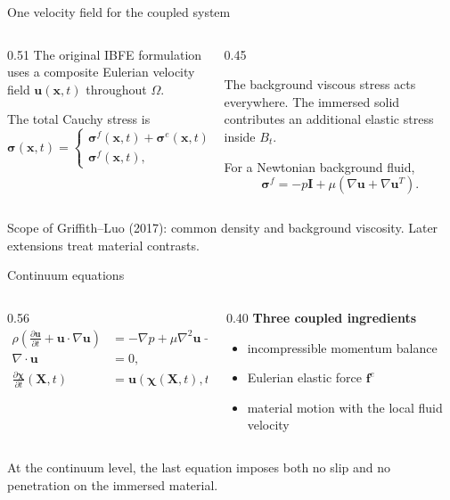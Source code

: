 \documentclass[aspectratio=169,11pt]{beamer}
\newcommand{\xvec}{\bm{x}}
\newcommand{\Xvec}{\bm{X}}
\newcommand{\uvec}{\bm{u}}
\newcommand{\fvec}{\bm{f}}
\newcommand{\stress}{\bm{\sigma}}
\newcommand{\estress}{\bm{\sigma}^{e}}
\newcommand{\Identity}{\bm{I}}
\begin{document}
\begin{frame}{One velocity field for the coupled system}
\begin{columns}[c,onlytextwidth]
\begin{column}{0.51\textwidth}
The original IBFE formulation uses a composite Eulerian velocity field \(\uvec(\xvec,t)\) throughout \(\Omega\).

\medskip
The total Cauchy stress is
\[
\stress(\xvec,t)=
\begin{cases}
\stress^f(\xvec,t)+\estress(\xvec,t), & \xvec\in B_t,\\
\stress^f(\xvec,t), & \xvec\notin B_t.
\end{cases}
\]
\end{column}
\begin{column}{0.45\textwidth}
\begin{punchbox}
The background viscous stress acts everywhere. The immersed solid contributes an additional elastic stress inside \(B_t\).
\end{punchbox}

\medskip
For a Newtonian background fluid,
\[
\stress^f=-p\Identity
+\mu\left(\nabla\uvec+\nabla\uvec^{T}\right).
\]
\end{column}
\end{columns}

\vfill
{\scriptsize Scope of Griffith--Luo (2017): common density and background viscosity. Later extensions treat material contrasts.}
\end{frame}

\begin{frame}{Continuum equations}
\begin{columns}[c,onlytextwidth]
\begin{column}{0.56\textwidth}
\begin{align*}
\rho\left(\frac{\partial\uvec}{\partial t}
+\uvec\!\cdot\!\nabla\uvec\right)
  &= -\nabla p+\mu\nabla^2\uvec+\fvec^{e},\\[2pt]
\nabla\!\cdot\uvec&=0,\\[2pt]
\frac{\partial\bm{\chi}}{\partial t}(\Xvec,t)
  &=\uvec(\bm{\chi}(\Xvec,t),t).
\end{align*}
\end{column}
\begin{column}{0.40\textwidth}
\textbf{Three coupled ingredients}
\begin{itemize}\itemsep7pt
  \item incompressible momentum balance
  \item Eulerian elastic force \(\fvec^e\)
  \item material motion with the local fluid velocity
\end{itemize}
\end{column}
\end{columns}

\medskip
\begin{punchbox}
At the continuum level, the last equation imposes both no slip and no penetration on the immersed material.
\end{punchbox}
\end{frame}
\end{document}
